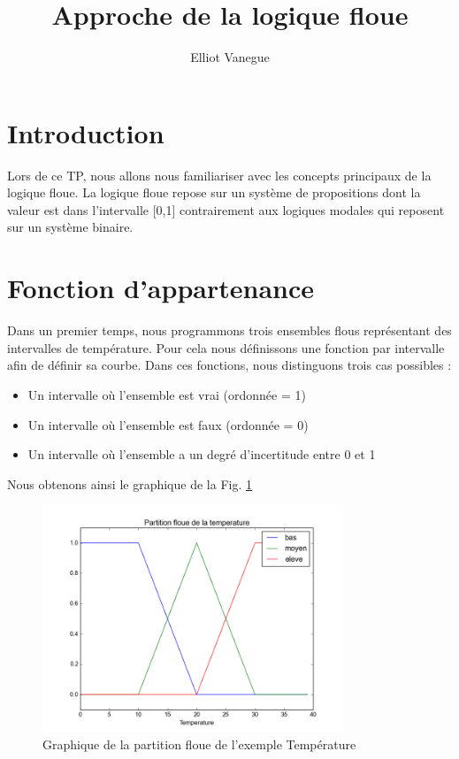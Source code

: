 \documentclass[a4paper,11pt]{article}
\title{Approche de la logique floue}
\author{Elliot Vanegue}
\begin{document}
\maketitle

\section{Introduction}
Lors de ce TP, nous allons nous familiariser avec les concepts principaux de la logique floue.
La logique floue repose sur un système de propositions dont la valeur est dans l'intervalle [0,1] contrairement aux logiques modales qui reposent sur un système binaire. 

\section{Fonction d'appartenance}
Dans un premier temps, nous programmons trois ensembles flous représentant des intervalles de température.
Pour cela nous définissons une fonction par intervalle afin de définir sa courbe. Dans ces fonctions, nous 
distinguons trois cas possibles :
\begin{itemize}
  \item Un intervalle où l'ensemble est vrai (ordonnée = 1)
  \item Un intervalle où l'ensemble est faux (ordonnée = 0)
  \item Un intervalle où l'ensemble a un degré d'incertitude entre 0 et 1
\end{itemize}
Nous obtenons ainsi le graphique de la Fig. \ref{fig:GraphiqueFlou} 

\begin{figure}[!h]
  \begin{center}
    \includegraphics[width=9cm]{tempFlou.png}
    \caption{Graphique de la partition floue de l'exemple \og Température \fg}
    \label{fig:GraphiqueFlou}
  \end{center}
\end{figure}
\end{document}

